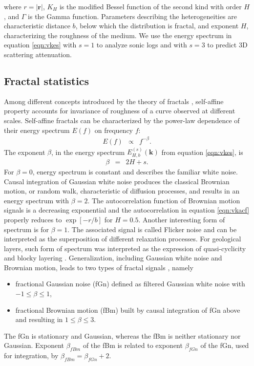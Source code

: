 where $r=|\mathbf{r}|$, $K_{H}$ is the modified Bessel function 
of the second kind with order $H$, and $\Gamma$ is the Gamma function. 
Parameters describing the heterogeneities are characteristic distance $b$,
below which the distribution is fractal,
and exponent $H$, characterizing the roughness of the medium.
We use the energy spectrum in equation \ref{eqn:vkes} with $s=1$ to analyze sonic logs
and with $s=3$ to predict 3D scattering attenuation.


\subsection{Fractal statistics}


Among different concepts introduced by the theory of fractals \cite[]{Mandelbrot_83},
self-affine property accounts for invariance of roughness of a curve observed at different scales.
Self-affine fractals can be characterized by the power-law dependence of their energy spectrum $E(f)$
on frequency $f$:
\begin{eqnarray}
E(f) & \propto & f^{-\beta}. \label{eqn:fracspec}
\end{eqnarray}
The exponent $\beta$, in the energy spectrum $E^{(s)}_{H,b}(\mathbf{k})$ from equation \ref{eqn:vkes}, is
\begin{eqnarray}
\beta & = & 2H+s. \label{eqn:fracexp}
\end{eqnarray}
For $\beta=0$, energy spectrum is constant and describes the familiar white noise.
Causal integration of Gaussian white noise produces the classical Brownian motion, or random walk,
characteristic of diffusion processes, and results in an energy spectrum with $\beta=2$. 
The autocorrelation function of Brownian motion signals is a decreasing exponential and
the autocorrelation in equation \ref{eqn:vkacf} properly reduces to $\exp{[-r/b]}$ for $H=0.5$.
Another interesting form of spectrum is for $\beta=1$.  
The associated signal is called Flicker noise \cite[]{Schottky_26,Dolan_BR98} and can be interpreted 
as the superposition of different relaxation processes.
For geological layers, such form of spectrum was interpreted as the expression
of quasi-cyclicity and blocky layering \cite[]{Shtatland_91}.
Generalization, including Gaussian white noise and Brownian motion, leads to two types 
of fractal signals \cite[]{Shtatland_91,Turcotte_97,Li_03}, namely
\begin{itemize} 
\item fractional Gaussian noise (fGn) defined as filtered Gaussian white noise with $-1 \leq \beta \leq 1$,
\item fractional Brownian motion (fBm) built by causal integration of fGn above and resulting in $1 \leq \beta \leq 3$.
\end{itemize}
The fGn is stationary and Gaussian, whereas the fBm is neither stationary nor Gaussian.
Exponent $\beta_{fBm}$ of the fBm is related to exponent $\beta_{fGn}$ of the fGn, used for integration, by 
$\beta_{fBm}=\beta_{fGn}+2$.

